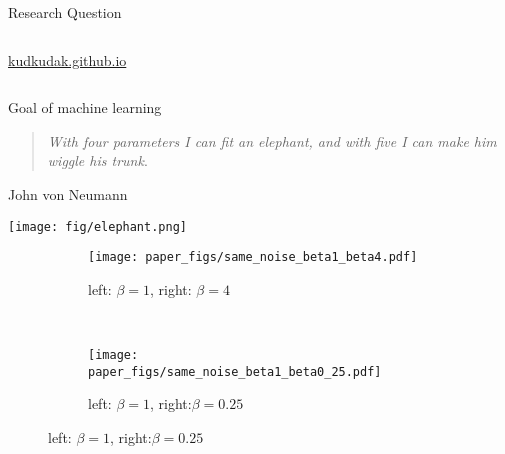 \begin{frame}{Research Question}
\begin{columns}[T]
\begin{column}{.48\textwidth}
\Large
\href{kudkudak.github.io}{kudkudak.github.io}
\end{column}%
\end{columns}


\begin{frame}{Goal of machine learning}
\begin{quote}
\textit{With four parameters I can fit an elephant, and with five I can make him wiggle his trunk}.
\end{quote}
\hspace{8cm} John von Neumann
\begin{center}
\texttt{[image: fig/elephant.png]}
\end{center}
\end{frame}




\begin{figure}
\centering
\begin{subfigure}[t]{0.45\textwidth}
  \centering
    \texttt{[image: paper\_figs/same\_noise\_beta1\_beta4.pdf]}
  \caption{{\tiny{left: $\beta=1$, right: $\beta=4$}}}
\end{subfigure}
~
\begin{subfigure}[t]{0.45\textwidth}
  \centering
 \texttt{[image: paper\_figs/same\_noise\_beta1\_beta0\_25.pdf]}
    \caption{{\tiny{left: $\beta=1$, right:$\beta=0.25$}}}
\end{subfigure}
\label{fig:same_noise_diff_bp}
\end{figure}



\end{frame}

